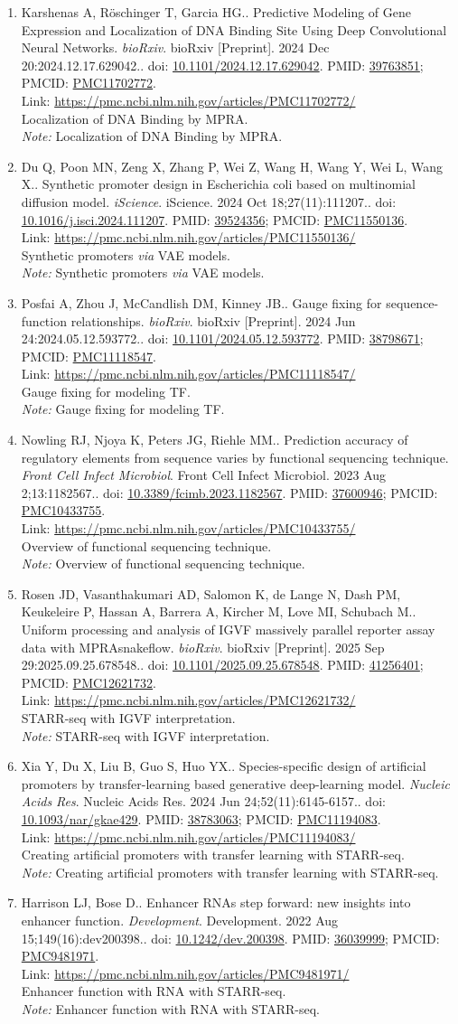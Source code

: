 \documentclass[12pt]{article}
\newcommand{\Pub}[9]{%
  \item #1. #2. \textit{#3}. #4. doi: \href{https://doi.org/#5}{#5}. PMID: \href{https://pubmed.ncbi.nlm.nih.gov/#6/}{#6}; PMCID: \href{https://www.ncbi.nlm.nih.gov/pmc/articles/#7/}{#7}. \\
  \noindent Link: \url{#8}\\
  \ifx#9\relax\else\\\textit{Note:} #9\fi
}
\begin{document}
\begin{enumerate}[leftmargin=*,label=\textbf{\arabic*.}]
\Pub{Karshenas A, Röschinger T, Garcia HG.}{Predictive Modeling of Gene Expression and Localization of DNA Binding Site Using Deep Convolutional Neural Networks}{bioRxiv}{bioRxiv [Preprint]. 2024 Dec 20:2024.12.17.629042.}{10.1101/2024.12.17.629042}{39763851}{PMC11702772}{https://pmc.ncbi.nlm.nih.gov/articles/PMC11702772/}{Localization of DNA Binding by MPRA.}

\Pub{Du Q, Poon MN, Zeng X, Zhang P, Wei Z, Wang H, Wang Y, Wei L, Wang X.}{Synthetic promoter design in Escherichia coli based on multinomial diffusion model}{iScience}{iScience. 2024 Oct 18;27(11):111207.}{10.1016/j.isci.2024.111207}{39524356}{PMC11550136}{https://pmc.ncbi.nlm.nih.gov/articles/PMC11550136/}{Synthetic promoters \textit{via} VAE models.}

\Pub{Posfai A, Zhou J, McCandlish DM, Kinney JB.}{Gauge fixing for sequence-function relationships}{bioRxiv}{bioRxiv [Preprint]. 2024 Jun 24:2024.05.12.593772.}{10.1101/2024.05.12.593772}{38798671}{PMC11118547}{https://pmc.ncbi.nlm.nih.gov/articles/PMC11118547/}{Gauge fixing for modeling TF.}

\Pub{Nowling RJ, Njoya K, Peters JG, Riehle MM.}{Prediction accuracy of regulatory elements from sequence varies by functional sequencing technique}{Front Cell Infect Microbiol}{Front Cell Infect Microbiol. 2023 Aug 2;13:1182567.}{10.3389/fcimb.2023.1182567}{37600946}{PMC10433755}{https://pmc.ncbi.nlm.nih.gov/articles/PMC10433755/}{Overview of functional sequencing technique.}

\newpage

\Pub{Rosen JD, Vasanthakumari AD, Salomon K, de Lange N, Dash PM, Keukeleire P, Hassan A, Barrera A, Kircher M, Love MI, Schubach M.}{Uniform processing and analysis of IGVF massively parallel reporter assay data with MPRAsnakeflow}{bioRxiv}{bioRxiv [Preprint]. 2025 Sep 29:2025.09.25.678548.}{10.1101/2025.09.25.678548}{41256401}{PMC12621732}{https://pmc.ncbi.nlm.nih.gov/articles/PMC12621732/}{STARR-seq with IGVF interpretation.}

\Pub{Xia Y, Du X, Liu B, Guo S, Huo YX.}{Species-specific design of artificial promoters by transfer-learning based generative deep-learning model}{Nucleic Acids Res}{Nucleic Acids Res. 2024 Jun 24;52(11):6145-6157.}{10.1093/nar/gkae429}{38783063}{PMC11194083}{https://pmc.ncbi.nlm.nih.gov/articles/PMC11194083/}{Creating artificial promoters with transfer learning with STARR-seq.}

\Pub{Harrison LJ, Bose D.}{Enhancer RNAs step forward: new insights into enhancer function}{Development}{Development. 2022 Aug 15;149(16):dev200398.}{10.1242/dev.200398}{36039999}{PMC9481971}{https://pmc.ncbi.nlm.nih.gov/articles/PMC9481971/}{Enhancer function with RNA with STARR-seq.}


\end{enumerate}
\end{document}
